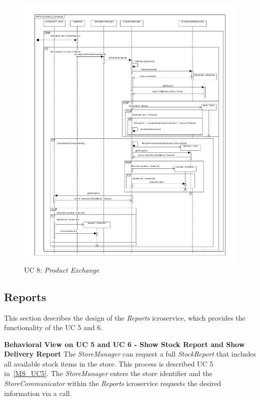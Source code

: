			\begin{figure}[!h]
				\centering
				\includegraphics[width = .9\textwidth]{img/UC8_Product_Exchange.pdf}
				\caption{UC 8: \textit{Product Exchange}}
				\label{MS_UC8}
			\end{figure}
		\FloatBarrier	
		
		\subsection{Reports}
		This section describes the design of the \textit{Reports} icroservice, which provides the functionality of the UC 5 and 6.
		
		\textbf{Behavioral View on UC 5 and UC 6 - Show Stock Report and Show Delivery Report} 
		The \textit{StoreManager} can request a full \textit{StockReport} that includes all available stock items in the store. 
		This process is described  UC 5 in~\ref{MS_UC5}. 
		The \textit{StoreManager} enters the store identifier and the \textit{StoreCommunicator} within the \textit{Reports} icroservice requests the desired information via a  call.
		
